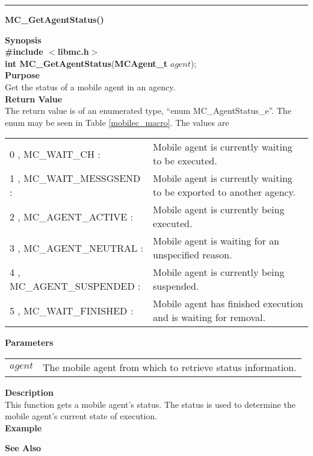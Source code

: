 \noindent
\vspace{5pt}
\rule{6.5in}{0.015in}
\noindent
{\LARGE \bf MC\_GetAgentStatus()}\\
{}
\label{api:MC_GetAgentStatus}

\noindent
{\bf Synopsis}\\
{\bf \#include $<$libmc.h$>$}\\
{\bf int MC\_GetAgentStatus}({\bf MCAgent\_t} $agent$);\\

\noindent
{\bf Purpose}\\
Get the status of a mobile agent in an agency.\\

\noindent
{\bf Return Value}\\
The return value is of an enumerated type, ``enum MC\_AgentStatus\_e''.
The enum may be seen in Table \vref{mobilec_macro}.
The values are
\vspace{-0.1in}
\begin{description}
\item               
\begin{tabular}{p{55 mm}p{120 mm}}
0 , MC\_WAIT\_CH : & Mobile agent is currently waiting to be executed.\\
1 , MC\_WAIT\_MESSGSEND : & Mobile agent is currently waiting to be exported to another agency.\\
2 , MC\_AGENT\_ACTIVE : & Mobile agent is currently being executed.\\
3 , MC\_AGENT\_NEUTRAL : & Mobile agent is waiting for an unspecified reason.\\
4 , MC\_AGENT\_SUSPENDED : & Mobile agent is currently being suspended.\\ 
5 , MC\_WAIT\_FINISHED : & Mobile agent has finished execution and is waiting for removal.
\end{tabular}
\end{description}

\noindent
{\bf Parameters}
\vspace{-0.1in}
\begin{description}
\item               
\begin{tabular}{p{10 mm}p{145 mm}}
$agent$ & The mobile agent from which to retrieve status information.
\end{tabular}
\end{description}

\noindent
{\bf Description}\\
This function gets a mobile agent's status. 
The status is used to determine the mobile agent's current state of execution.\\

\noindent
{\bf Example}\\
\noindent
{\footnotesize}

\noindent
{\bf See Also}\\

